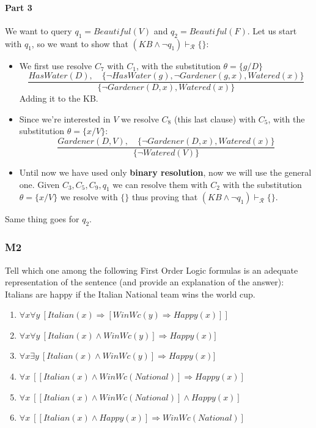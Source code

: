 \documentclass[10pt,a4paper]{article}
\begin{document}
\begin{itemize}
\paragraph{Part 3}
We want to query $q_1=Beautiful(V)$ and $q_2=Beautiful(F)$. Let us start with $q_1$, so we want to show that $(KB \wedge \neg q_1)\vdash_{\mathcal{R}} \{\}$:
\begin{itemize}
\item We first use resolve $C_7$ with $C_1$, with the substitution $\theta=\{g/D\}$
\[\frac{ HasWater(D),\quad \lbrace \neg HasWater(g), \neg Gardener(g,x), Watered(x)\rbrace}{\lbrace \neg Gardener(D,x), Watered(x)\rbrace}\]
Adding it to the KB.
\item Since we're interested in $V$ we resolve $C_8$ (this last clause) with $C_5$, with the substitution $\theta=\{x/V\}$:
\[\frac{Gardener(D,V),\quad \lbrace \neg Gardener(D,x), Watered(x)\rbrace}{\lbrace \neg Watered(V)\rbrace}\]
\item Until now we have used only \textbf{binary resolution}, now we will use the general one. Given $C_3,C_5,C_9,q_1$ we can resolve them with $C_2$ with the substitution $\theta=\{x/V\}$ we resolve with $\{\}$ thus proving that $(KB \wedge \neg q_1)\vdash_{\mathcal{R}} \{\}$.
\end{itemize}
Same thing goes for $q_2$.


\subsubsection{M2}
Tell which one among the following First Order Logic formulas is an adequate representation of the sentence (and provide an explanation of the answer):
Italians are happy if the Italian National team wins the world cup.
\begin{enumerate}
\item $\forall x\forall y\ [Italian(x)\Rightarrow [WinWc(y)\Rightarrow Happy(x)]]$
\item $\forall x\forall y\ [Italian(x)\wedge WinWc(y)]\Rightarrow Happy(x)]$
\item $\forall x\exists y\ [Italian(x)\wedge WinWc(y)]\Rightarrow Happy(x)]$
\item $\forall x\ [[Italian(x)\wedge WinWc(National)]\Rightarrow Happy(x)]$
\item $\forall x\ [[Italian(x)\wedge WinWc(National)]\wedge Happy(x)]$
\item $\forall x\ [[Italian(x)\wedge Happy(x)]\Rightarrow  WinWc(National)]$
\end{enumerate}


\end{itemize}
\end{document}

